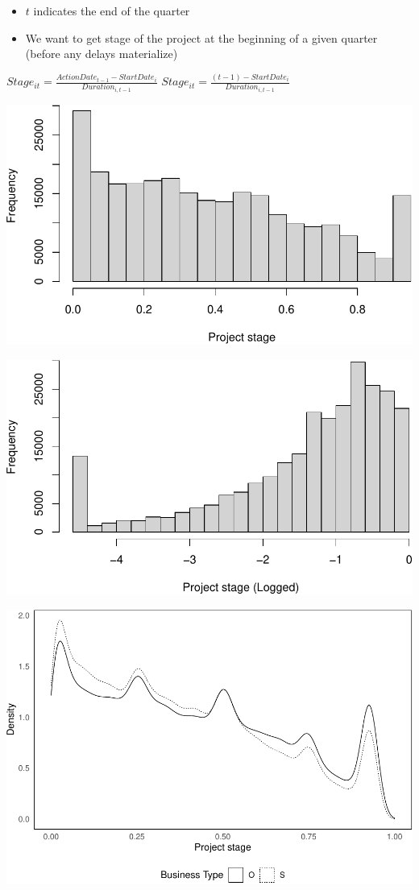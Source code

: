 \documentclass[
]{article}
\providecommand{\tightlist}{%
  \setlength{\itemsep}{0pt}\setlength{\parskip}{0pt}}
\begin{document}
\begin{itemize}
\tightlist
\item
  \(t\) indicates the end of the quarter
\item
  We want to get stage of the project at the beginning of a given
  quarter (before any delays materialize)
\end{itemize}

\(Stage_{it}=\frac{ActionDate_{t-1}-StartDate_i}{Duration_{i,t-1}}\)
\(Stage_{it}=\frac{(t-1)-StartDate_i}{Duration_{i,t-1}}\)

\includegraphics{qp_first_pc_delay-2_files/figure-latex/stage_plots_1-1.pdf}

\includegraphics{qp_first_pc_delay-2_files/figure-latex/stage_plots_2-1.pdf}

\includegraphics{qp_first_pc_delay-2_files/figure-latex/stage_plots_3-1.pdf}
\end{document}
